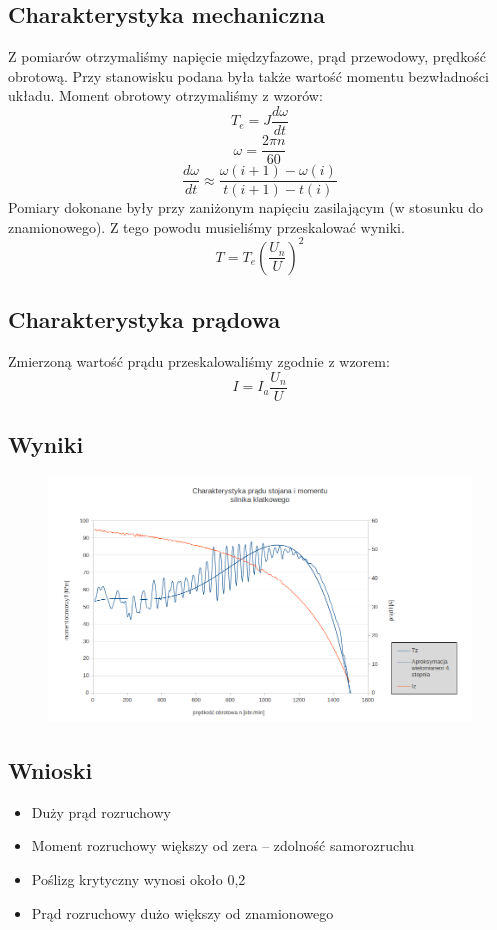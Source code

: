 \documentclass[12pt]{article}
\begin{document}
\subsection{Charakterystyka mechaniczna}
Z pomiarów otrzymaliśmy napięcie międzyfazowe, prąd przewodowy, prędkość obrotową. Przy stanowisku podana była także wartość momentu bezwładności układu. Moment obrotowy otrzymaliśmy z wzorów:
\begin{equation}
	T_e = J\frac{d\omega}{dt}
\end{equation}
\begin{equation}
	\omega=\frac{2\pi n}{60}
\end{equation}
\begin{equation}
	\frac{d\omega}{dt}\approx\frac{\omega(i+1)-\omega(i)}{t(i+1)-t(i)}
\end{equation}
Pomiary dokonane były przy zaniżonym napięciu zasilającym (w stosunku do znamionowego). Z tego powodu musieliśmy przeskalować wyniki.
\begin{equation}
	T=T_e\left(\frac{U_n}{U}\right)^2
\end{equation}
\subsection{Charakterystyka prądowa}
Zmierzoną wartość prądu przeskalowaliśmy zgodnie z wzorem:
\begin{equation}
	I=I_a\frac{U_n}{U}
\end{equation}
\subsection{Wyniki}
	\begin{figure}[H]
	\centering
	\includegraphics[width=13 cm]{wykresy/ch_klatkowy}
	\end{figure}
\subsection{Wnioski}
\begin{itemize}
\item Duży prąd rozruchowy
\item Moment rozruchowy większy od zera – zdolność samorozruchu
\item Poślizg krytyczny wynosi około 0,2
\item Prąd rozruchowy dużo większy od znamionowego
\end{itemize}
\end{document}
